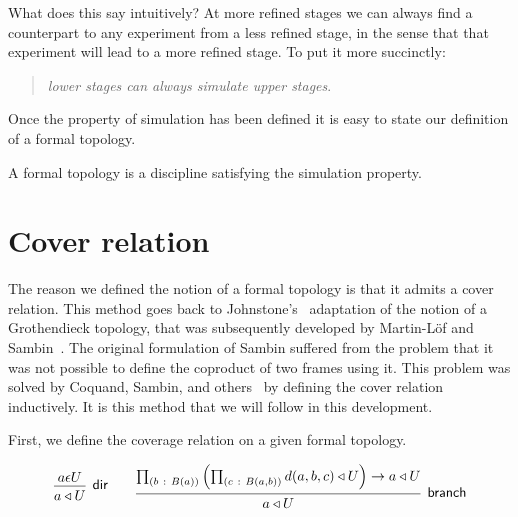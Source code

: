 What does this say intuitively? At more refined stages we can always find a counterpart to
any experiment from a less refined stage, in the sense that that experiment will lead to a
more refined stage. To put it more succinctly:
\begin{quote}
  \emph{lower stages can always simulate upper stages}.
\end{quote}

Once the property of simulation has been defined it is easy to state our
definition of a formal topology.
\begin{defn}
  A formal topology is a discipline satisfying the simulation property.
\end{defn}

\section{Cover relation}

 The reason we defined the
notion of a formal topology is that it admits a cover relation. This method goes back to
Johnstone's~\cite{stone-spaces} adaptation of the notion of a Grothendieck topology, that
was subsequently developed by Martin-L\"{o}f and Sambin~\cite{int-formal-spaces}. The
original formulation of Sambin suffered from the problem that it was not possible to
define the coproduct of two frames using it. This problem was solved by Coquand, Sambin,
and others~\cite{coq-sambin} by defining the cover relation inductively. It is this method
that we will follow in this development.

First, we define the coverage relation on a given formal topology.
\begin{defn}
  \[
  \begin{prooftree}
    \hypo{ a \epsilon U }
    \infer1[\textsf{dir}]{\covers{a}{U}}
  \end{prooftree}
  \qquad
  \begin{prooftree}
    \hypo{
      \pity{b}{B(a)}{\left( \pity{c}{B(a, b)}{d(a, b, c) \triangleleft U} \right) \rightarrow a \triangleleft U}
    }
    \infer1[\textsf{branch}]{\covers{a}{U}}
  \end{prooftree}
  \]
\end{defn}

